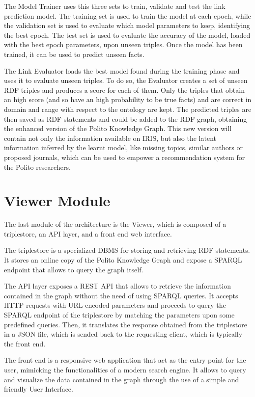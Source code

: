 \documentclass[%
    corpo=13.5pt,
    twoside,
    oldstyle,
    tipotesi=magistrale,
    greek,
    evenboxes
]{toptesi}
\begin{document}
The Model Trainer uses this three sets to train, validate and test the link
prediction model.
The training set is used to train the model at each epoch, while the validation set
is used to evaluate which model parameters to keep, identifying the best epoch.
The test set is used to evaluate the accuracy of the model, loaded with the best
epoch parameters, upon unseen triples. Once the model has been trained, it can
be used to predict unseen facts.

The Link Evaluator loads the best model found during the training phase and
uses it to evaluate unseen triples.
To do so, the Evaluator creates a set of unseen RDF triples and produces a score
for each of them. Only the triples that obtain an high score (and so have an high
probability to be true facts) and are correct in domain and range with respect
to the ontology are kept.
The predicted triples are then saved as RDF statements and could be added
to the RDF graph, obtaining the enhanced version of the Polito Knowledge Graph.
This new version will contain not only the information available on IRIS, but
also the latent information inferred by the learnt model, like missing topics,
similar authors or proposed journals, which can be used to empower a
recommendation system for the Polito researchers.

\section{Viewer Module}

The last module of the architecture is the Viewer, which is composed of a
triplestore, an API layer, and a front end web interface.

The triplestore is a specialized DBMS for storing and retrieving RDF
statements.
It stores an online copy of the Polito Knowledge Graph and expose a
SPARQL endpoint that allows to query the graph itself.

The API layer exposes a REST API that allows to retrieve the information
contained in the graph without the need of using SPARQL queries. It accepts HTTP
requests with URL-encoded parameters and proceeds to query the SPARQL endpoint
of the triplestore by matching the parameters upon some predefined queries.
Then, it translates the response obtained from the triplestore in a JSON file,
which is sended back to the requesting client, which is typically the front end.

The front end is a responsive web application that act as the entry point for
the user, mimicking the functionalities of a modern search engine. It allows
to query and visualize the data contained in the graph through the use
of a simple and friendly User Interface.
\end{document}
